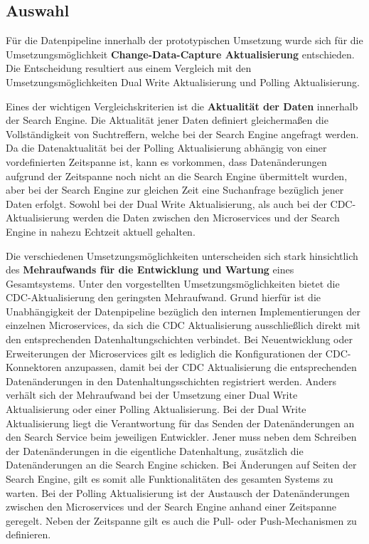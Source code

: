 \subsection{Auswahl\label{subsec4.1.5:Unterunterpunkt-5}}

Für die Datenpipeline innerhalb der prototypischen Umsetzung wurde sich für die Umsetzungsmöglichkeit \glqq \textbf{Change-Data-Capture Aktualisierung}\grqq{} entschieden. Die Entscheidung resultiert aus einem Vergleich mit den Umsetzungsmöglichkeiten \glqq Dual Write Aktualisierung\grqq{} und \glqq Polling Aktualisierung\grqq{}.

Eines der wichtigen Vergleichskriterien ist die \textbf{Aktualität der Daten} innerhalb der Search Engine. Die Aktualität jener Daten definiert gleichermaßen die Vollständigkeit von Suchtreffern, welche bei der Search Engine angefragt werden. Da die Datenaktualität bei der Polling Aktualisierung abhängig von einer vordefinierten Zeitspanne ist, kann es vorkommen, dass Datenänderungen aufgrund der Zeitspanne noch nicht an die Search Engine übermittelt wurden, aber bei der Search Engine zur gleichen Zeit eine Suchanfrage bezüglich jener Daten erfolgt. Sowohl bei der Dual Write Aktualisierung, als auch bei der CDC-Aktualisierung werden die Daten zwischen den Microservices und der Search Engine in nahezu Echtzeit aktuell gehalten.

Die verschiedenen Umsetzungsmöglichkeiten unterscheiden sich stark hinsichtlich des \textbf{Mehraufwands für die Entwicklung und Wartung} eines Gesamtsystems. Unter den vorgestellten Umsetzungsmöglichkeiten bietet die CDC-Aktualisierung den geringsten Mehraufwand. Grund hierfür ist die Unabhängigkeit der Datenpipeline bezüglich den internen Implementierungen der einzelnen Microservices, da sich die CDC Aktualisierung ausschließlich direkt mit den entsprechenden Datenhaltungschichten verbindet. Bei Neuentwicklung oder Erweiterungen der Microservices gilt es lediglich die Konfigurationen der CDC-Konnektoren anzupassen, damit bei der CDC Aktualisierung die entsprechenden Datenänderungen in den Datenhaltungsschichten registriert werden. Anders verhält sich der Mehraufwand bei der Umsetzung einer Dual Write Aktualisierung oder einer Polling Aktualisierung. Bei der Dual Write Aktualisierung liegt die Verantwortung für das Senden der Datenänderungen an den Search Service beim jeweiligen Entwickler. Jener muss neben dem Schreiben der Datenänderungen in die eigentliche Datenhaltung, zusätzlich die Datenänderungen an die Search Engine schicken. Bei Änderungen auf Seiten der Search Engine, gilt es somit alle Funktionalitäten des gesamten Systems zu warten. Bei der Polling Aktualisierung ist der Austausch der Datenänderungen zwischen den Microservices und der Search Engine anhand einer Zeitspanne geregelt. Neben der Zeitspanne gilt es auch die Pull- oder Push-Mechanismen zu definieren.

